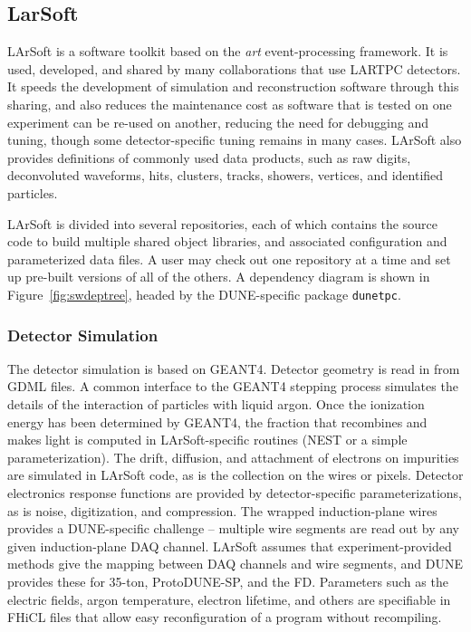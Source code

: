 \subsection{LarSoft}

LArSoft is a software toolkit based on the {\it art} event-processing framework.  It is used, developed, and
shared by many collaborations that use LARTPC detectors.  It speeds the development of simulation and reconstruction
software through this sharing, and also reduces the maintenance cost as software that is tested on one
experiment can be re-used on another, reducing the need for debugging and tuning, though some detector-specific
tuning remains in many cases.  LArSoft also provides definitions of commonly used data products, such as raw digits,
deconvoluted waveforms, hits, clusters, tracks, showers, vertices, and identified particles.

LArSoft is divided into several repositories, each of which contains the source code to build multiple shared
object libraries, and associated configuration and parameterized data files.  A user may check out one repository
at a time and set up pre-built versions of all of the others.  A dependency diagram is shown in 
Figure~\ref{fig:swdeptree}, headed by the DUNE-specific package {\tt dunetpc}.

\subsubsection{Detector Simulation}

The detector simulation is based on GEANT4.  Detector geometry is read in from GDML files.  A common interface to
the GEANT4 stepping process simulates the details of the interaction of particles with liquid argon.  Once
the ionization energy has been determined by GEANT4, the fraction that recombines and makes light is computed
in LArSoft-specific routines (NEST or a simple parameterization).  The drift, diffusion, and attachment of electrons
on impurities are simulated in LArSoft code, as is the collection on the wires or pixels.  Detector electronics
response functions are provided by detector-specific parameterizations, as is noise, digitization, and compression.
The wrapped induction-plane wires provides a DUNE-specific challenge -- multiple wire segments are read out by
any given induction-plane DAQ channel.  LArSoft assumes that experiment-provided methods give the mapping between
DAQ channels and wire segments, and DUNE provides these for 35-ton, ProtoDUNE-SP, and the FD.  Parameters
such as the electric fields, argon temperature, electron lifetime, and others are specifiable in FHiCL files
that allow easy reconfiguration of a program without recompiling.

